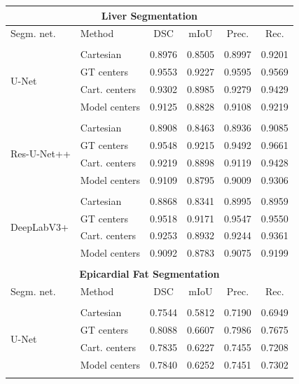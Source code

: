 \begin{table}[t!]
\ContinuedFloat
\centering
\def\arraystretch{1.2}
\begin{tabularx}{\textwidth}{X X c c c c} 
\\ [-2ex]
\multicolumn{6}{c}{\textbf{Liver Segmentation}}\\[1ex]
 \hline
 Segm. net. & Method & DSC & mIoU & Prec. & Rec. \\ 
 \hline \\ [-1.5ex]
 \multirow{4}{7em}{{U-Net}}
& Cartesian & 0.8976 & 0.8505 & 0.8997 & 0.9201 \\
& GT centers & 0.9553 & 0.9227 & 0.9595 & 0.9569 \\
& Cart. centers & 0.9302 & 0.8985 & 0.9279 & 0.9429 \\
& Model centers & 0.9125 & 0.8828 & 0.9108 & 0.9219 \\ [1ex]
\hline \\ [-1.5ex]

 \multirow{4}{7em}{{Res-U-Net++}}
& Cartesian & 0.8908 & 0.8463 & 0.8936 & 0.9085 \\
& GT centers & 0.9548 & 0.9215 & 0.9492 & 0.9661 \\
& Cart. centers & 0.9219 & 0.8898 & 0.9119 & 0.9428 \\
& Model centers & 0.9109 & 0.8795 & 0.9009 & 0.9306 \\ [1ex]
\hline \\ [-1.5ex]

 \multirow{4}{7em}{{DeepLabV3+}}
& Cartesian & 0.8868 & 0.8341 & 0.8995 & 0.8959 \\
& GT centers & 0.9518 & 0.9171 & 0.9547 & 0.9550 \\
& Cart. centers & 0.9253 & 0.8932 & 0.9244 & 0.9361 \\
& Model centers & 0.9092 & 0.8783 & 0.9075 & 0.9199 \\ [1ex]
\hline \\ [-1.5ex]

\multicolumn{6}{c}{\textbf{Epicardial Fat Segmentation}}\\[1ex]
 \hline
 Segm. net. & Method & DSC & mIoU & Prec. & Rec. \\ 
 \hline \\ [-1.5ex]
 \multirow{4}{7em}{{U-Net}}
& Cartesian & 0.7544 & 0.5812 & 0.7190 & 0.6949 \\
& GT centers & 0.8088 & 0.6607 & 0.7986 & 0.7675 \\
& Cart. centers & 0.7835 & 0.6227 & 0.7455 & 0.7208 \\
& Model centers & 0.7840 & 0.6252 & 0.7451 & 0.7302 \\ [1ex]
\hline \\ [-1.5ex]


\end{tabularx}
\end{table}
